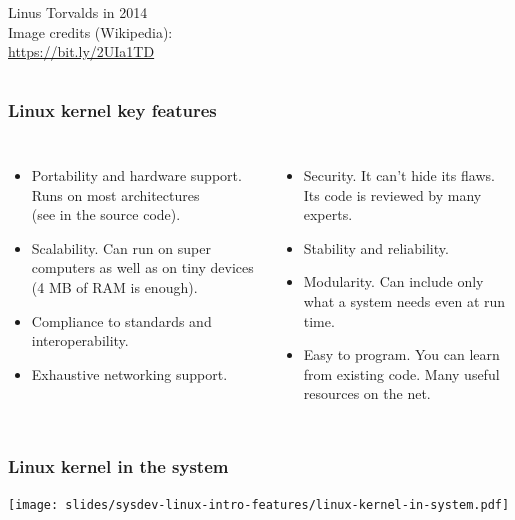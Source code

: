 \begin{frame}
\begin{columns}
      \scriptsize
      Linus Torvalds in 2014\\
      \tiny
      Image credits (Wikipedia):\\
      \url{https://bit.ly/2UIa1TD}
    \end{columns}
\end{frame}

\begin{frame}
  \frametitle{Linux kernel key features}
  \begin{columns}
    \begin{itemize}
    \item Portability and hardware support. Runs on most architectures\\
      (see  in the source code).
    \item Scalability. Can run on super computers as well as on tiny
      devices (4 MB of RAM is enough).
    \item Compliance to standards and interoperability.
    \item Exhaustive networking support.
    \end{itemize}
    \begin{itemize}
    \item Security. It can't hide its flaws. Its code is reviewed by
      many experts.
    \item Stability and reliability.
    \item Modularity. Can include only what a system needs even at run
      time.
    \item Easy to program. You can learn from existing code. Many
      useful resources on the net.
    \end{itemize}
  \end{columns}
\end{frame}

\begin{frame}
  \frametitle{Linux kernel in the system}
  \begin{center}
    \texttt{[image: slides/sysdev-linux-intro-features/linux-kernel-in-system.pdf]}
  \end{center}
\end{frame}

